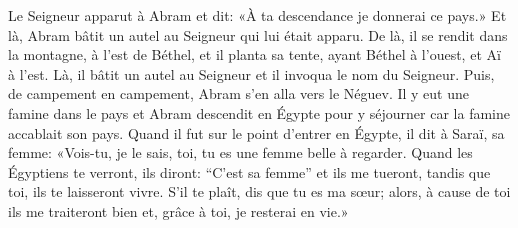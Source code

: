 Le Seigneur apparut à Abram et dit:
	«À ta descendance je donnerai ce pays.»
	Et là, Abram bâtit un autel au Seigneur qui lui était apparu.
De là, il se rendit dans la montagne, à l’est de Béthel,
	et il planta sa tente, ayant Béthel à l’ouest, et Aï à l’est.
	Là, il bâtit un autel au Seigneur et il invoqua le nom du Seigneur.
Puis, de campement en campement, Abram s’en alla vers le Néguev.
Il y eut une famine dans le pays
	et Abram descendit en Égypte pour y séjourner
	car la famine accablait son pays.
Quand il fut sur le point d’entrer en Égypte, il dit à Saraï, sa femme:
	«Vois-tu, je le sais, toi, tu es une femme belle à regarder.
	Quand les Égyptiens te verront,
	ils diront: “C’est sa femme” et ils me tueront,
	tandis que toi, ils te laisseront vivre.
S’il te plaît, dis que tu es ma sœur;
	alors, à cause de toi ils me traiteront bien
	et, grâce à toi, je resterai en vie.»

